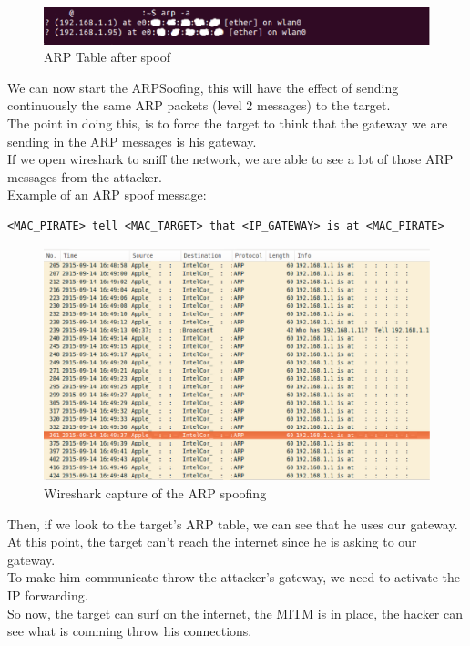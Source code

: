 \documentclass[a4paper, 11pt, oneside]{article}
\begin{document}
\begin{figure}[!h]
	\centering
	\includegraphics[scale=0.75]{../images/arpTableAfterSpoof.eps}
	\caption{ARP Table after spoof}
	\label{ARP_after_spoof}
\end{figure}
We can now start the ARPSoofing, this will have the effect of sending continuously the same ARP packets (level 2 messages) to the target.\\
The point in doing this, is to force the target to think that the gateway we are sending in the ARP messages is his gateway.\\
If we open wireshark to sniff the network, we are able to see a lot of those ARP messages from the attacker.\\

Example of an ARP spoof message: 
\begin{center}
\begin{verbatim}
<MAC_PIRATE> tell <MAC_TARGET> that <IP_GATEWAY> is at <MAC_PIRATE>
\end{verbatim}
\end{center}

\begin{figure}[!h]
	\centering
	\includegraphics[scale=0.55]{../images/wiresharArpSpoof.eps}
	\caption{Wireshark capture of the ARP spoofing}
	\label{Wireshark_ARP_Spoof}
\end{figure}

Then, if we look to the target's ARP table, we can see that he uses our gateway.\\
At this point, the target can't reach the internet since he is asking to our gateway.\\
To make him communicate throw the attacker's gateway, we need to activate the IP forwarding.\\
So now, the target can surf on the internet, the MITM is in place, the hacker can see what is comming throw his connections.\\
\end{document}
